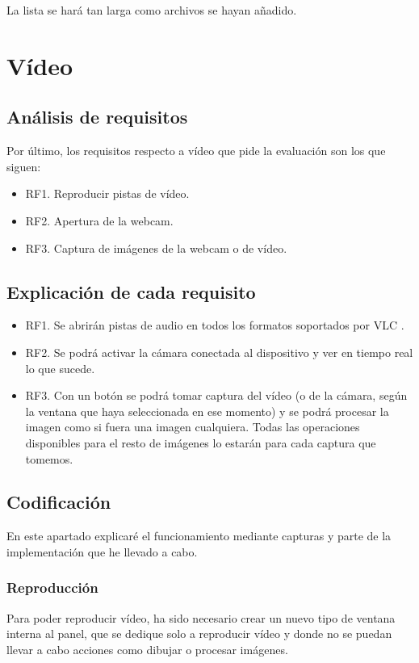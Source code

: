 \documentclass[11pt,a4paper]{article}
\begin{document}
La lista se hará tan larga como archivos se hayan añadido.

\newpage

\section{Vídeo}

\subsection{Análisis de requisitos}
Por último, los requisitos respecto a vídeo que pide la evaluación son los que siguen:

\begin{itemize}
	\item RF1. Reproducir pistas de vídeo.
	\item RF2. Apertura de la webcam.
	\item RF3. Captura de imágenes de la webcam o de vídeo.
\end{itemize}

\subsection{Explicación de cada requisito}

\begin{itemize}
	\item RF1. Se abrirán pistas de audio en todos los formatos soportados por VLC \footnotemark .
	\item RF2. Se podrá activar la cámara conectada al dispositivo y ver en tiempo real lo que sucede.
	\item RF3. Con un botón se podrá tomar captura del vídeo (o de la cámara, según la ventana que haya seleccionada en ese momento) y se podrá procesar la imagen como si fuera una imagen cualquiera. Todas las operaciones disponibles para el resto de imágenes lo estarán para cada captura que tomemos.
\end{itemize}

\subsection{Codificación}
En este apartado explicaré el funcionamiento mediante capturas y parte de la implementación que he llevado a cabo.

\subsubsection{Reproducción}
Para poder reproducir vídeo, ha sido necesario crear un nuevo tipo de ventana interna al panel, que se dedique solo a reproducir vídeo y donde no se puedan llevar a cabo acciones como dibujar o procesar imágenes.\\
\end{document}
